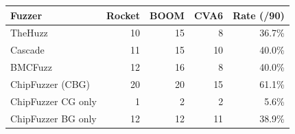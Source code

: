 \begin{tabular}{@{}l r r r r@{}}\toprule
Fuzzer & Rocket & BOOM & CVA6 & Rate (/90)\\\midrule
TheHuzz & 10 & 15 & 8 & 36.7\%\\
Cascade & 11 & 15 & 10 & 40.0\%\\
BMCFuzz & 12 & 16 & 8 & 40.0\%\\
ChipFuzzer (CBG) & 20 & 20 & 15 & 61.1\%\\
ChipFuzzer CG only & 1 & 2 & 2 & 5.6\%\\
ChipFuzzer BG only & 12 & 12 & 11 & 38.9\%\\
\bottomrule\end{tabular}